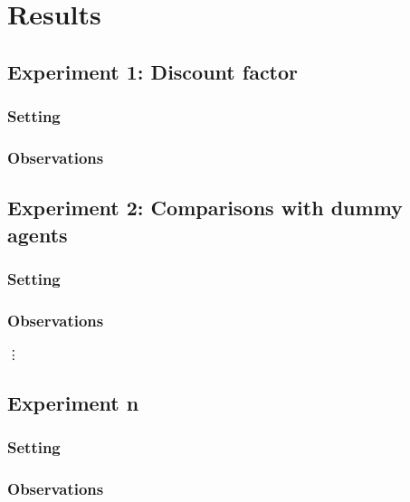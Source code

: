 \documentclass[11pt]{article}
\begin{document}
\section{Results}

\subsection{Experiment 1: Discount factor}

\subsubsection{Setting}

\subsubsection{Observations}

\subsection{Experiment 2: Comparisons with dummy agents}

\subsubsection{Setting}

\subsubsection{Observations}

\vdots

\subsection{Experiment n}

\subsubsection{Setting}

\subsubsection{Observations}
\end{document}
